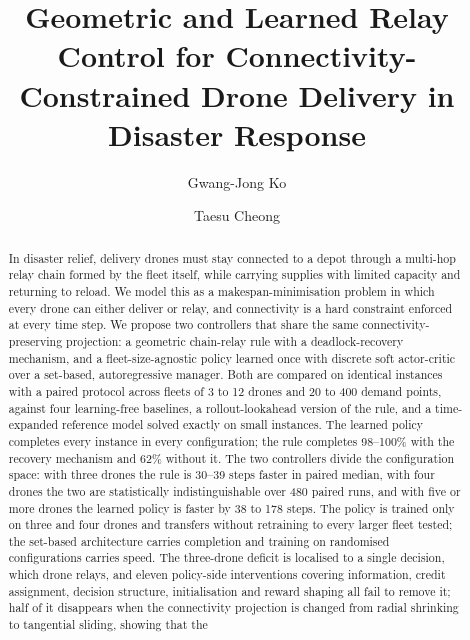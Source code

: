 \documentclass[final,5p,times,twocolumn]{elsarticle}
\begin{document}
\begin{frontmatter}

\title{Geometric and Learned Relay Control for Connectivity-Constrained Drone Delivery in Disaster Response}

\author[ku]{Gwang-Jong Ko}
\author[ku]{Taesu Cheong}

\begin{abstract}
In disaster relief, delivery drones must stay connected to a depot through a multi-hop
relay chain formed by the fleet itself, while carrying supplies with limited capacity and
returning to reload. We model this as a makespan-minimisation problem in which every drone can
either deliver or relay, and connectivity is a hard constraint enforced at every time step. We
propose two controllers that share the same connectivity-preserving projection: a geometric
chain-relay rule with a deadlock-recovery mechanism, and a fleet-size-agnostic policy learned
once with discrete soft actor-critic over a set-based, autoregressive manager. Both are compared
on identical instances with a paired protocol across fleets of 3 to 12 drones and 20 to 400
demand points, against four learning-free baselines, a rollout-lookahead version of the rule, and
a time-expanded reference model solved exactly on small instances. The learned policy completes every instance in every configuration;
the rule completes 98--100\% with the recovery mechanism and 62\% without it. The two
controllers divide the configuration space: with three drones the rule is 30--39 steps
faster in paired median, with four drones the two are statistically indistinguishable over 480 paired runs, and with
five or more drones the learned policy is faster by 38 to 178 steps. The policy is trained only
on three and four drones and transfers without retraining to every larger fleet tested; the
set-based architecture carries completion and training on randomised configurations carries
speed. The three-drone deficit is localised to a single decision, which drone relays, and eleven
policy-side interventions covering information, credit assignment, decision structure,
initialisation and reward shaping all fail to remove it; half of it disappears when the
connectivity projection is changed from radial shrinking to tangential sliding, showing that the

\end{abstract}
\end{frontmatter}
\end{document}
